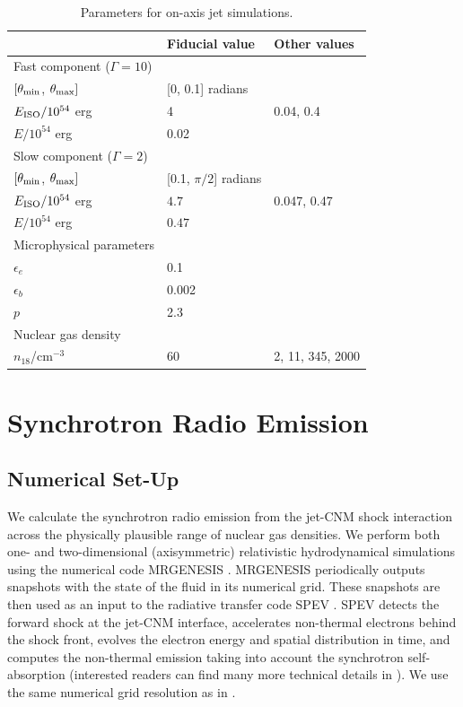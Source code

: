 \documentclass[usenatbib,fleqn]{mnras}
\begin{document}
\begin{table}
\begin{threeparttable}
  \caption{\label{tab:jetParams} Parameters for on-axis jet simulations.}
  \begin{tabular*}{0.95\columnwidth}{lll}
\hline
& Fiducial value & Other values \\
\hline\hline
    Fast component ($\Gamma=10$) &  &  \\ 
    \hline
    $[\theta_{\rm min}$, $\theta_{\rm max}]$ & [0, 0.1] radians & \\
    $E_{\rm ISO}/10^{54}$ erg & 4  & 0.04, 0.4\\
    $E/10^{54}$ erg & 0.02 & \\
    \hline 
    Slow component ($\Gamma=2$)\\
\hline
    $[\theta_{\rm min}$, $\theta_{\rm max}]$ & [0.1, $\pi/2$] radians
    & \\
    $E_{\rm ISO}/10^{54}$ erg & $4.7$ & 0.047, 0.47 \\
    $E/10^{54}$  erg & $0.47$ & \\
    \hline
    Microphysical parameters\\
\hline
    $\epsilon_e$ & 0.1 & \\
    $\epsilon_b$ & 0.002 & \\
    $p$ & 2.3\\
    \hline 
    Nuclear gas density \\
\hline
    $n_{18}$/cm$^{-3}$ & 60 & 2, 11, 345, 2000
  \end{tabular*}
\end{threeparttable}
\end{table}


\section{Synchrotron Radio Emission}

\label{sec:results}
\subsection{Numerical Set-Up}
\label{sec:numerical}
We calculate the synchrotron radio emission from the jet-CNM shock
interaction across the physically plausible range of nuclear gas
densities.  We perform both one- and two-dimensional (axisymmetric)
relativistic hydrodynamical simulations using the numerical code
MRGENESIS \citep{MimicaGianniosAloy2009}. MRGENESIS periodically
outputs snapshots with the state of the fluid in its numerical
grid. These snapshots are then used as an input to the radiative
transfer code SPEV \citep{Mimica+2009}. SPEV detects the forward shock
at the jet-CNM interface, accelerates non-thermal electrons behind
the shock front, evolves the electron energy and spatial distribution
in time, and computes the non-thermal emission taking into account the
synchrotron self-absorption (interested readers can find many more
technical details in \citealt{Mimica+2016}). We use the same
numerical grid resolution as in \citet{Mimica+2015}.
\end{document}
